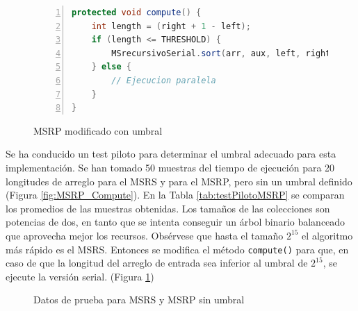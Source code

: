 \documentclass[titlepage]{article}
\begin{document}
\begin{figure}[h]
	\begin{lstlisting}[language=java, frame=single, numbers=left]
protected void compute() {
	int length = (right + 1 - left);
	if (length <= THRESHOLD) {
		MSrecursivoSerial.sort(arr, aux, left, right);
	} else {
		// Ejecucion paralela
	}
}
	\end{lstlisting}
	\caption{MSRP modificado con umbral}
	\label{fig:computeModificado}
\end{figure}

Se ha conducido un test piloto para determinar el umbral adecuado para esta implementación. Se han tomado 50 muestras del tiempo de ejecución para 20 longitudes de arreglo para el MSRS y para el MSRP, pero sin un umbral definido (Figura \ref{fig:MSRP_Compute}). En la Tabla \ref{tab:testPilotoMSRP} se comparan los promedios de las muestras obtenidas. Los tamaños de las colecciones son potencias de dos, en tanto que se intenta conseguir un árbol binario balanceado que aprovecha mejor los recursos. Obsérvese que hasta el tamaño $2^{15}$ el algoritmo más rápido es el MSRS. Entonces se modifica el método \lstinline|compute()| para que, en caso de que la longitud del arreglo de entrada sea inferior al umbral de $2^{15}$, se ejecute la versión serial. (Figura \ref{fig:computeModificado})

\begin{figure}
	\centering
	\caption{Datos de prueba para MSRS y MSRP sin umbral} 
	\label{fig:testPilotoMSRP}
\end{figure}
\end{document}
